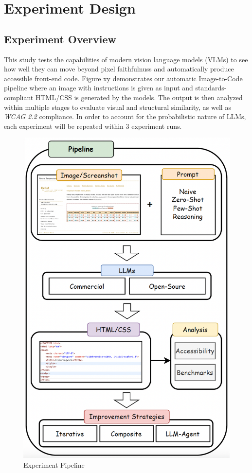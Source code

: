 \chapter{Experiment Design}\label{chapter:Experiment}

\section{Experiment Overview}
This study tests the capabilities of modern vision language models (VLMs) 
to see how well they can move beyond pixel faithfulnuss and automatically
produce accessible front-end code. 
Figure xy demonstrates our automatic Image-to-Code pipeline where an 
image with instructions is given as input and standards-compliant HTML/CSS 
is generated by the models.
The output is then analyzed within multiple stages to evaluate visual 
and structural similarity, as well as \textit{WCAG 2.2} compliance.\newline
In order to account for the probabilistic nature of LLMs, each experiment 
will be repeated within 3 experiment runs.

\begin{figure}[p]
  \centering
  \includegraphics[width=\textwidth]{figures/pipeline.png}
  \caption{Experiment Pipeline}
  \label{fig:pipeline}
\end{figure}


